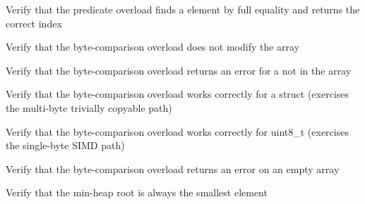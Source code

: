 \begin{DoxyRefList}
%
Verify that the predicate overload finds a  element by full equality and returns the correct index  
\item[Global \doxylink{test__array_8cpp_af0c5248d2fde3cddc9ebcfae90756aa7}{TEST\+\_\+F} (\doxylink{classArrayInitTest}{Array\+Init\+Test}, Contains\+Byte\+Does\+Not\+Modify\+Array)]\label{test__test000175}%
%
Verify that the byte-\/comparison overload does not modify the array  
\item[Global \doxylink{test__array_8cpp_a37f4f159275dc2e55221f0d50d727535}{TEST\+\_\+F} (\doxylink{classArrayInitTest}{Array\+Init\+Test}, Contains\+Byte\+Point\+Not\+Found\+Returns\+Error)]\label{test__test000174}%
%
Verify that the byte-\/comparison overload returns an error for a  not in the array  
\item[Global \doxylink{test__array_8cpp_ab5e34b082bdf2c42c810dd2ab24a94e0}{TEST\+\_\+F} (\doxylink{classArrayInitTest}{Array\+Init\+Test}, Contains\+Byte\+Point\+Finds\+Value)]\label{test__test000173}%
%
Verify that the byte-\/comparison overload works correctly for a  struct (exercises the multi-\/byte trivially copyable path)  
\item[Global \doxylink{test__array_8cpp_a10b3af90eeb68036081d1fa0968f0699}{TEST\+\_\+F} (\doxylink{classArrayInitTest}{Array\+Init\+Test}, Contains\+Byte\+Uint8\+Finds\+Value)]\label{test__test000172}%
%
Verify that the byte-\/comparison overload works correctly for uint8\+\_\+t (exercises the single-\/byte SIMD path)  
\item[Global \doxylink{test__array_8cpp_a279baf0de471d753f669ad3209350da2}{TEST\+\_\+F} (\doxylink{classArrayInitTest}{Array\+Init\+Test}, Contains\+Byte\+Int\+Empty\+Array\+Returns\+Error)]\label{test__test000171}%
%
Verify that the byte-\/comparison overload returns an error on an empty array  
\item[Global \doxylink{test__heap_8cpp_a916bfb3b37960f5ba7a22e4638931865}{TEST\+\_\+F} (\doxylink{classHeapMinTest}{Heap\+Min\+Test}, Min\+Heap\+Root\+Is\+Always\+Smallest)]\label{test__test000271}%
%
Verify that the min-\/heap root is always the smallest element  
\item[Global \doxylink{test__heap_8cpp_a09506f97b857d8b32ba2e3cc7a89a4c5}{TEST\+\_\+F} (\doxylink{classHeapMinTest}{Heap\+Min\+Test}, Pop\+Empty\+Heap\+Returns\+Error)]\label{test__test000280}%

\end{DoxyRefList}
